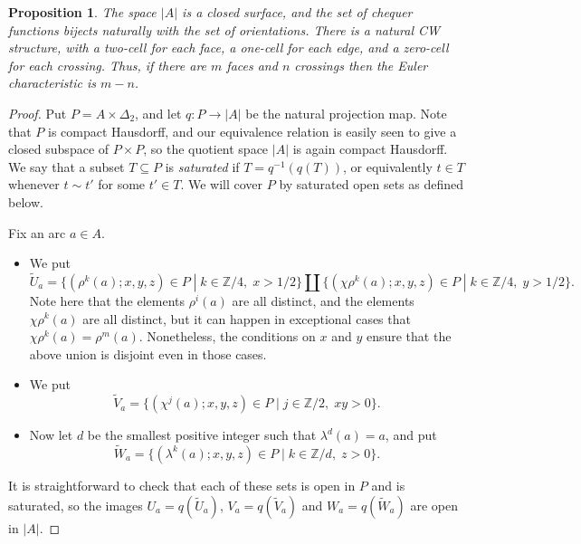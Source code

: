 \documentclass{amsart}
\newcommand{\Z}         {{\mathbb{Z}}}
\newcommand{\st}        {\;|\;}
\newcommand{\tm}        {\times}
\newcommand{\Dl}        {\Delta}
\newcommand{\lm}        {\lambda}
\newcommand{\tU}	{\widetilde{U}}
\newcommand{\tV}	{\widetilde{V}}
\newcommand{\tW}	{\widetilde{W}}
\newcommand{\sse}       {\subseteq}
\renewcommand{\:}{\colon}
\newtheorem{proposition}[theorem]{Proposition}
\theoremstyle{definition}
\begin{document}
\begin{proposition}
 The space $|A|$ is a closed surface, and the set of chequer functions
 bijects naturally with the set of orientations.  There is a natural
 CW structure, with a two-cell for each face, a one-cell for each
 edge, and a zero-cell for each crossing.  Thus, if there are $m$
 faces and $n$ crossings then the Euler characteristic is $m-n$.
\end{proposition}
\begin{proof}
 Put $P=A\tm\Dl_2$, and let $q\:P\to |A|$ be the natural projection
 map.  Note that $P$ is compact Hausdorff, and our equivalence
 relation is easily seen to give a closed subspace of $P\tm P$, so the
 quotient space $|A|$ is again compact Hausdorff.
 We say that a subset $T\sse P$ is \emph{saturated} if
 $T=q^{-1}(q(T))$, or equivalently $t\in T$ whenever $t\sim t'$ for
 some $t'\in T$.  We will cover $P$ by saturated open sets as defined
 below. 

 Fix an arc $a\in A$.
 \begin{itemize}
  \item We put 
   \[ \tU_a=\{(\rho^k(a);x,y,z)\in P\st k\in\Z/4,\;x>1/2\}
            \amalg\{(\chi\rho^k(a);x,y,z)\in P\st k\in\Z/4,\;y>1/2\}.
   \]
   Note here that the elements $\rho^i(a)$ are all distinct, and the
   elements $\chi\rho^k(a)$ are all distinct, but it can happen in
   exceptional cases that $\chi\rho^k(a)=\rho^m(a)$.  Nonetheless, the
   conditions on $x$ and $y$ ensure that the above union is disjoint
   even in those cases.
  \item We put
   \[ \tV_a = \{(\chi^j(a);x,y,z)\in P\st j\in\Z/2,\;xy>0\}. \]
  \item Now let $d$ be the smallest positive integer such that
   $\lm^d(a)=a$, and put
   \[ \tW_a=\{(\lm^k(a);x,y,z)\in P\st k\in\Z/d,\;z>0\}. \]
 \end{itemize}
 It is straightforward to check that each of these sets is open in $P$
 and is saturated, so the images $U_a=q(\tU_a)$, $V_a=q(\tV_a)$ and
 $W_a=q(\tW_a)$ are open in $|A|$.


\end{proof}
\end{document}
